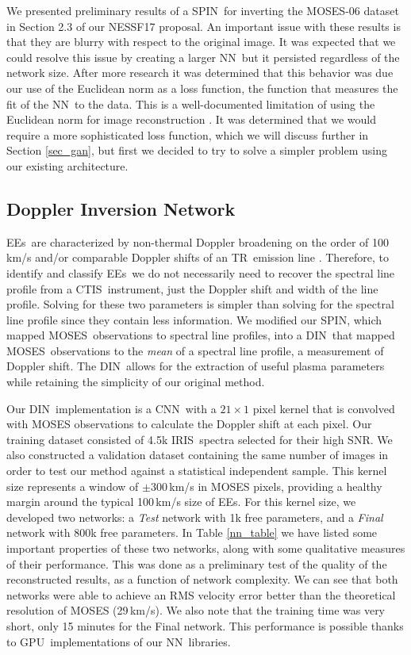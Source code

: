 \documentclass[10pt,letterpaper, doublespace]{article}
\newcommand{\TR}{\ac{TR}}
\newcommand{\EEs}{\acp{EE}}
\newcommand{\CTIS}{\ac{CTIS}}
\newcommand{\MOSES}{\ac{MOSES}}
\newcommand{\NN}{\ac{NN}}
\newcommand{\CNN}{\ac{CNN}}
\newcommand{\DIN}{\ac{DIN}}
\newcommand{\SPIN}{\ac{SPIN}}
\newcommand{\IRIS}{\ac{IRIS}}
\newcommand{\GPU}{\ac{GPU}}
\newcommand{\SNR}{\ac{SNR}}
\begin{document}
		We presented preliminary results of a \SPIN\ for inverting the \MOSES-06 dataset in Section 2.3 of our NESSF17 proposal.
		An important issue with these results is that they are blurry with respect to the original image.
		It was expected that we could resolve this issue by creating a larger \NN\, but it persisted regardless of the network size.
		After more research it was determined that this behavior was due our use of the Euclidean norm as a loss function, the function that measures the fit of the \NN\ to the data.
		This is a well-documented limitation of using the Euclidean norm for image reconstruction \citep{Pathak2016}.
		It was determined that we would require a more sophisticated loss function, which we will discuss further in Section \ref{sec_gan}, but first we decided to try to solve a simpler problem using our existing architecture.
					
		\subsection{Doppler Inversion Network}
		
			\EEs\ are characterized by non-thermal Doppler broadening on the order of 100\,km/s and/or comparable Doppler shifts of an \TR\ emission line \citep{Dere1989}.
			Therefore, to identify and classify \EEs\ we do not necessarily need to recover the spectral line profile from a \CTIS\ instrument, just the Doppler shift and width of the line profile.
			Solving for these two parameters is simpler than solving for the spectral line profile since they contain less information.
			We modified our \SPIN, which mapped \MOSES\ observations to spectral line profiles, into a \DIN\ that mapped \MOSES\ observations to the \textit{mean} of a spectral line profile, a measurement of Doppler shift.
			The \DIN\ allows for the extraction of useful plasma parameters while retaining the simplicity of our original method.
			
			Our \DIN\ implementation is a \CNN\ with a $21\times 1$ pixel kernel that is convolved with MOSES observations to calculate the Doppler shift at each pixel.
			Our training dataset consisted of 4.5k \IRIS\ spectra selected for their high \SNR. We also constructed a validation dataset containing the same number of images in order to test our method against a statistical independent sample.
			This kernel size represents a window of $\pm$300\,km/s in MOSES pixels, providing a healthy margin around the typical 100\,km/s size of \EEs \citep{Dere1994}.
			For this kernel size, we developed two networks: a \textit{Test} network with 1k free parameters, and a \textit{Final} network with 800k free parameters.
			In Table \ref{nn_table} we have listed some important properties of these two networks, along with some qualitative measures of their performance.
			This was done as a preliminary test of the quality of the reconstructed results, as a function of network complexity.
			We can see that both networks were able to achieve an RMS velocity error better than the theoretical resolution of MOSES (29\,km/s).
			We also note that the training time was very short, only 15 minutes for the Final network.
			This performance is possible thanks to \GPU\ implementations of our \NN\ libraries.
			
\end{document}
